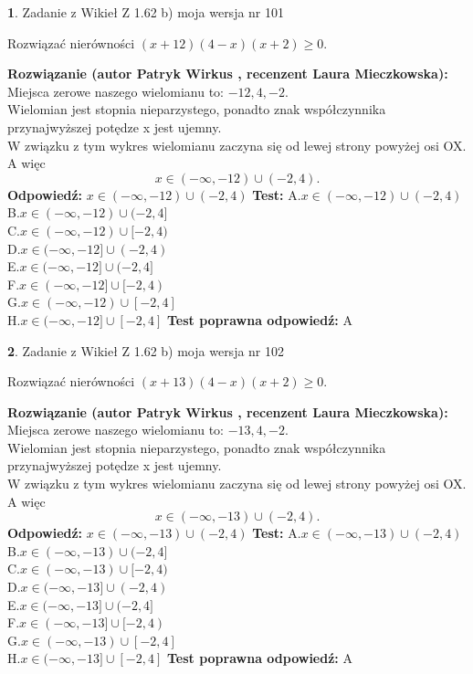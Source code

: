 \documentclass[12pt, a4paper]{article}
\theoremstyle{definition} %
\newtheorem{zad}{}
\newcommand{\zadStart}[1]{\begin{zad}#1\newline}
\newcommand{\zadStop}{\end{zad}}
\newcommand{\rozwStart}[2]{\noindent \textbf{Rozwiązanie (autor #1 , recenzent #2): }\newline}
\newcommand{\rozwStop}{\newline}
\newcommand{\odpStart}{\noindent \textbf{Odpowiedź:}\newline}
\newcommand{\odpStop}{\newline}
\newcommand{\testStart}{\noindent \textbf{Test:}\newline}
\newcommand{\testStop}{\newline}
\newcommand{\kluczStart}{\noindent \textbf{Test poprawna odpowiedź:}\newline}
\newcommand{\kluczStop}{\newline}
\begin{document}
\zadStart{Zadanie z Wikieł Z 1.62 b) moja wersja nr 101}

Rozwiązać nierówności $(x+12)(4-x)(x+2)\ge0$.
\zadStop
\rozwStart{Patryk Wirkus}{Laura Mieczkowska}
Miejsca zerowe naszego wielomianu to: $-12, 4, -2$.\\
Wielomian jest stopnia nieparzystego, ponadto znak współczynnika przy\linebreak najwyższej potędze x jest ujemny.\\ W związku z tym wykres wielomianu zaczyna się od lewej strony powyżej osi OX. A więc $$x \in (-\infty,-12) \cup (-2,4).$$
\rozwStop
\odpStart
$x \in (-\infty,-12) \cup (-2,4)$
\odpStop
\testStart
A.$x \in (-\infty,-12) \cup (-2,4)$\\
B.$x \in (-\infty,-12) \cup (-2,4]$\\
C.$x \in (-\infty,-12) \cup [-2,4)$\\
D.$x \in (-\infty,-12] \cup (-2,4)$\\
E.$x \in (-\infty,-12] \cup (-2,4]$\\
F.$x \in (-\infty,-12] \cup [-2,4)$\\
G.$x \in (-\infty,-12) \cup [-2,4]$\\
H.$x \in (-\infty,-12] \cup [-2,4]$
\testStop
\kluczStart
A
\kluczStop



\zadStart{Zadanie z Wikieł Z 1.62 b) moja wersja nr 102}

Rozwiązać nierówności $(x+13)(4-x)(x+2)\ge0$.
\zadStop
\rozwStart{Patryk Wirkus}{Laura Mieczkowska}
Miejsca zerowe naszego wielomianu to: $-13, 4, -2$.\\
Wielomian jest stopnia nieparzystego, ponadto znak współczynnika przy\linebreak najwyższej potędze x jest ujemny.\\ W związku z tym wykres wielomianu zaczyna się od lewej strony powyżej osi OX. A więc $$x \in (-\infty,-13) \cup (-2,4).$$
\rozwStop
\odpStart
$x \in (-\infty,-13) \cup (-2,4)$
\odpStop
\testStart
A.$x \in (-\infty,-13) \cup (-2,4)$\\
B.$x \in (-\infty,-13) \cup (-2,4]$\\
C.$x \in (-\infty,-13) \cup [-2,4)$\\
D.$x \in (-\infty,-13] \cup (-2,4)$\\
E.$x \in (-\infty,-13] \cup (-2,4]$\\
F.$x \in (-\infty,-13] \cup [-2,4)$\\
G.$x \in (-\infty,-13) \cup [-2,4]$\\
H.$x \in (-\infty,-13] \cup [-2,4]$
\testStop
\kluczStart
A
\kluczStop
\end{document}
